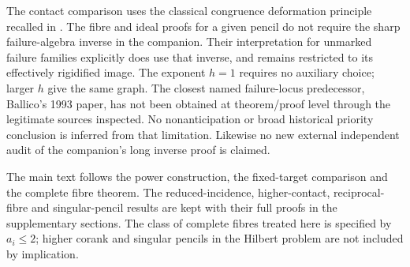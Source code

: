 The contact comparison uses the classical congruence deformation
principle recalled in \cite{Dmytryshyn162}. The fibre and ideal
proofs for a given pencil do not require the sharp failure-algebra
inverse in the companion. Their interpretation for unmarked
failure families explicitly does use that inverse, and remains
restricted to its effectively rigidified image. The exponent
$h=1$ requires no auxiliary choice; larger $h$ give the same graph.
The closest named failure-locus predecessor, Ballico's 1993 paper,
has not been obtained at theorem/proof level through the legitimate
sources inspected. No nonanticipation or broad historical priority
conclusion is inferred from that limitation. Likewise no new
external independent audit of the companion's long inverse proof
is claimed.

The main text follows the power construction, the fixed-target
comparison and the complete fibre theorem. The reduced-incidence,
higher-contact, reciprocal-fibre and singular-pencil results are
kept with their full proofs in the supplementary sections. The
class of complete fibres treated here is specified by $a_i\leq2$;
higher corank and singular pencils in the Hilbert problem are not
included by implication.

